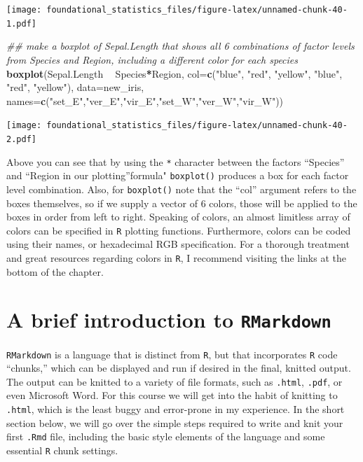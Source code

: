 \documentclass[]{book}
\newenvironment{Shaded}{\begin{snugshade}}{\end{snugshade}}
\newcommand{\CommentTok}[1]{\textcolor[rgb]{0.56,0.35,0.01}{\textit{#1}}}
\newcommand{\DataTypeTok}[1]{\textcolor[rgb]{0.13,0.29,0.53}{#1}}
\newcommand{\KeywordTok}[1]{\textcolor[rgb]{0.13,0.29,0.53}{\textbf{#1}}}
\newcommand{\NormalTok}[1]{#1}
\newcommand{\OperatorTok}[1]{\textcolor[rgb]{0.81,0.36,0.00}{\textbf{#1}}}
\newcommand{\StringTok}[1]{\textcolor[rgb]{0.31,0.60,0.02}{#1}}
\begin{document}
\texttt{[image: foundational\_statistics\_files/figure-latex/unnamed-chunk-40-1.pdf]}

\begin{Shaded}
\begin{Highlighting}[]
\CommentTok{## make a boxplot of Sepal.Length that shows all 6 combinations of factor levels from Species and Region, including a different color for each species}
\KeywordTok{boxplot}\NormalTok{(Sepal.Length }\OperatorTok{~}\StringTok{ }\NormalTok{Species}\OperatorTok{*}\NormalTok{Region, }\DataTypeTok{col=}\KeywordTok{c}\NormalTok{(}\StringTok{"blue"}\NormalTok{, }\StringTok{"red"}\NormalTok{, }\StringTok{"yellow"}\NormalTok{, }\StringTok{"blue"}\NormalTok{, }\StringTok{"red"}\NormalTok{, }\StringTok{"yellow"}\NormalTok{),}
        \DataTypeTok{data=}\NormalTok{new_iris, }\DataTypeTok{names=}\KeywordTok{c}\NormalTok{(}\StringTok{"set_E"}\NormalTok{,}\StringTok{"ver_E"}\NormalTok{,}\StringTok{"vir_E"}\NormalTok{,}\StringTok{"set_W"}\NormalTok{,}\StringTok{"ver_W"}\NormalTok{,}\StringTok{"vir_W"}\NormalTok{))}
\end{Highlighting}
\end{Shaded}

\texttt{[image: foundational\_statistics\_files/figure-latex/unnamed-chunk-40-2.pdf]}

Above you can see that by using the \texttt{*} character between the factors ``Species'' and ``Region in our plotting''formula" \texttt{boxplot()} produces a box for each factor level combination. Also, for \texttt{boxplot()} note that the ``col'' argument refers to the boxes themselves, so if we supply a vector of 6 colors, those will be applied to the boxes in order from left to right. Speaking of colors, an almost limitless array of colors can be specified in \texttt{R} plotting functions. Furthermore, colors can be coded using their names, or hexadecimal RGB specification. For a thorough treatment and great resources regarding colors in \texttt{R}, I recommend visiting the links at the bottom of the chapter.

\hypertarget{a-brief-introduction-to-rmarkdown}{%
\section{\texorpdfstring{A brief introduction to \texttt{RMarkdown}}{A brief introduction to RMarkdown}}\label{a-brief-introduction-to-rmarkdown}}

\texttt{RMarkdown} is a language that is distinct from \texttt{R}, but that incorporates \texttt{R} code ``chunks,'' which can be displayed and run if desired in the final, knitted output. The output can be knitted to a variety of file formats, such as \texttt{.html}, \texttt{.pdf}, or even Microsoft Word. For this course we will get into the habit of knitting to \texttt{.html}, which is the least buggy and error-prone in my experience. In the short section below, we will go over the simple steps required to write and knit your first \texttt{.Rmd} file, including the basic style elements of the language and some essential \texttt{R} chunk settings.
\end{document}
